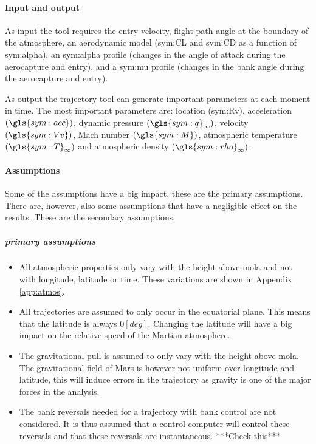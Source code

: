 \paragraph{Input and output}
As input the tool requires the entry velocity, flight path angle at the boundary of the atmosphere, an aerodynamic model (\gls{sym:CL} and \gls{sym:CD} as a function of \gls{sym:alpha}), an \gls{sym:alpha} profile (changes in the angle of attack during the aerocapture and entry), and a \gls{sym:mu} profile (changes in the bank angle during the aerocapture and entry).

As output the trajectory tool can generate important parameters at each moment in time. The most important parameters are: location (\gls{sym:Rv}), acceleration $\left(\gls{sym:acc}\right)$, dynamic pressure $\left(\gls{sym:q}_{\infty}\right)$, velocity $\left(\gls{sym:Vv}\right)$, Mach number $\left(\gls{sym:M}\right)$, atmospheric temperature $\left(\gls{sym:T}_{\infty}\right)$ and atmospheric density $\left(\gls{sym:rho}_{\infty}\right)$.

\paragraph{Assumptions}
 \label{sec:astroassumption}
 Some of the assumptions have a big impact, these are the primary assumptions. There are, however, also some assumptions that have a negligible effect on the results. These are the secondary assumptions.
 
 \subparagraph{primary assumptions}
 \begin{itemize}
 \item All atmospheric properties only vary with the height above \gls{mola} and not with longitude, latitude or time. These variations are shown in Appendix \ref{app:atmos}. 
 \item All trajectories are assumed to only occur in the equatorial plane. This means that the latitude is always $0 \left[deg\right]$. Changing the latitude will have a big impact on the relative speed of the Martian atmosphere.
 \item The gravitational pull is assumed to only vary with the height above \gls{mola}. The gravitational field of Mars is however not uniform over longitude and latitude, this will induce errors in the trajectory as gravity is one of the major forces in the analysis.
 \item The bank reversals needed for a trajectory with bank control are not considered. It is thus assumed that a control computer will control these reversals and that these reversals are instantaneous. ***Check this***
 \end{itemize}

